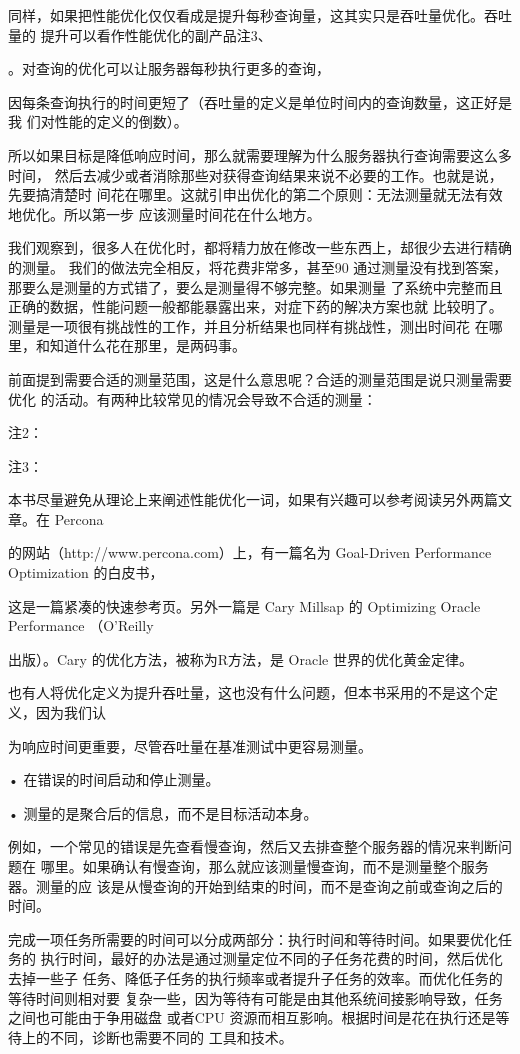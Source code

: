 同样，如果把性能优化仅仅看成是提升每秒查询量，这其实只是吞吐量优化。吞吐量的
提升可以看作性能优化的副产品注3、

。对查询的优化可以让服务器每秒执行更多的查询，

因每条查询执行的时间更短了（吞吐量的定义是单位时间内的查询数量，这正好是我
们对性能的定义的倒数）。

所以如果目标是降低响应时间，那么就需要理解为什么服务器执行查询需要这么多时间，
然后去减少或者消除那些对获得查询结果来说不必要的工作。也就是说，先要搞清楚时
间花在哪里。这就引申出优化的第二个原则：无法测量就无法有效地优化。所以第一步
应该测量时间花在什么地方。

我们观察到，很多人在优化时，都将精力放在修改一些东西上，𨚫很少去进行精确的测量。
我们的做法完全相反，将花费非常多，甚至90%
通过测量没有找到答案，那要么是测量的方式错了，要么是测量得不够完整。如果测量
了系统中完整而且正确的数据，性能问题一般都能暴露出来，对症下药的解决方案也就
比较明了。测量是一项很有挑战性的工作，并且分析结果也同样有挑战性，测出时间花
在哪里，和知道什么花在那里，是两码事。

前面提到需要合适的测量范围，这是什么意思呢？合适的测量范围是说只测量需要优化
的活动。有两种比较常见的情况会导致不合适的测量：

注2：

注3：

本书尽量避免从理论上来阐述性能优化一词，如果有兴趣可以参考阅读另外两篇文章。在 Percona

的网站（http://www.percona.com）上，有一篇名为 Goal-Driven Performance Optimization 的白皮书，

这是一篇紧凑的快速参考页。另外一篇是 Cary Millsap 的 Optimizing Oracle Performance （O'Reilly

出版）。Cary 的优化方法，被称为R方法，是 Oracle 世界的优化黄金定律。

也有人将优化定义为提升吞吐量，这也没有什么问题，但本书采用的不是这个定义，因为我们认

为响应时间更重要，尽管吞吐量在基准测试中更容易测量。

• 在错误的时间启动和停止测量。

• 测量的是聚合后的信息，而不是目标活动本身。

例如，一个常见的错误是先查看慢查询，然后又去排查整个服务器的情况来判断问题在
哪里。如果确认有慢查询，那么就应该测量慢查询，而不是测量整个服务器。测量的应
该是从慢查询的开始到结束的时间，而不是查询之前或查询之后的时间。

完成一项任务所需要的时间可以分成两部分：执行时间和等待时间。如果要优化任务的
执行时间，最好的办法是通过测量定位不同的子任务花费的时间，然后优化去掉一些子
任务、降低子任务的执行频率或者提升子任务的效率。而优化任务的等待时间则相对要
复杂一些，因为等待有可能是由其他系统间接影响导致，任务之间也可能由于争用磁盘
或者CPU 资源而相互影响。根据时间是花在执行还是等待上的不同，诊断也需要不同的
工具和技术。

